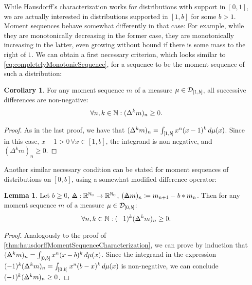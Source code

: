 \documentclass[a4paper]{scrreprt}
\theoremstyle{definition}
\newtheorem{lemma}[thm]{Lemma} %
\newtheorem{cor}[thm]{Corollary}
\begin{document}
    While Hausdorff's characterization works for distributions with support in $[0, 1]$, we are actually interested in distributions supported in $[1, b]$ for some $b > 1$.
    Moment sequences behave somewhat differently in that case: For example, while they are monotonically decreasing in the former case, they are monotonically increasing in the latter, even growing without bound if there is some mass to the right of $1$.
    We can obtain a first necessary criterion, which looks similar to \eqref{eq:completelyMonotonicSequence}, for a sequence to be the moment sequence of such a distribution:
    \begin{cor}
        \label{cor:hausdorff-1-b-necessaryCondition}
        For any moment sequence $m$ of a measure $\mu \in \mathcal{D}_{[1, b]}$, all successive differences are non-negative:
        \begin{gather}
            \forall n, k \in \mathbb{N}: (\Delta^k m)_n \geq 0.
        \end{gather}
    \end{cor}
    \begin{proof}
        As in the last proof, we have that $(\Delta^k m)_n = \int_{[1, b]} x^n (x-1)^k \, d\mu(x)$.
        Since in this case, $x-1 > 0 \,\forall x \in [1, b]$, the integrand is non-negative, and $(\Delta^k m)_n \geq 0$.
    \end{proof}

    Another similar necessary condition can be stated for moment sequences of distributions on $[0, b]$, using a somewhat modified difference operator:
    \newcommand{\DeltaB}[1]{\Delta\hspace{-.225cm}{\mathrel{\raisebox{0.045cm}{\scalebox{.9}{$\scriptscriptstyle#1$}}}\hspace{.22cm}}\hspace{-0.09cm}}
    \begin{lemma}
        \label{lemma:hausdorff-0-b-necessaryCondition}
        Let $b \geq 0$, $\DeltaB{b}: \R^{\N_0} \to \R^{\N_0}$, $(\DeltaB{b} m)_n \coloneqq m_{n+1} - b * m_n$.
        Then for any moment sequence $m$ of a measure $\mu \in \mathcal{D}_{[0, b]}$:
        \begin{gather}            
            \forall n, k \in \N: (-1)^k (\DeltaB{b}^k m)_n \geq 0.
        \end{gather}
    \end{lemma}
    \begin{proof}
        Analogously to the proof of \ref{thm:hausdorffMomentSequenceCharacterization},
        we can prove by induction that $(\DeltaB{b}^k m)_n = \lintegral{[0, b]}{x^n (x-b)^k}{\mu(x)}$.
        Since the integrand in the expression $(-1)^k (\DeltaB{b}^k m)_n = \lintegral{[0, b]}{x^n (b - x)^k}{\mu(x)}$ is non-negative, we can conclude $(-1)^k (\DeltaB{b}^k m)_n \geq 0$.
    \end{proof}
\end{document}
